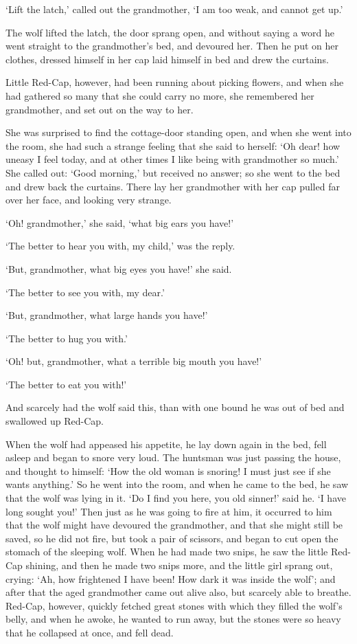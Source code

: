 \documentclass[oneside,11pt]{memoir} %
\begin{document}
`Lift the latch,' called out the grandmother, `I am too weak, and cannot get up.'

The wolf lifted the latch, the door sprang open, and without saying a word he went straight to the grandmother's bed, and devoured her. Then he put on her clothes, dressed himself in her cap laid himself in bed and drew the curtains.

Little Red-Cap, however, had been running about picking flowers, and when she had gathered so many that she could carry no more, she remembered her grandmother, and set out on the way to her.

She was surprised to find the cottage-door standing open, and when she went into the room, she had such a strange feeling that she said to herself: `Oh dear! how uneasy I feel today, and at other times I like being with grandmother so much.' She called out: `Good morning,' but received no answer; so she went to the bed and drew back the curtains. There lay her grandmother with her cap pulled far over her face, and looking very strange.

`Oh! grandmother,' she said, `what big ears you have!'

`The better to hear you with, my child,' was the reply.

`But, grandmother, what big eyes you have!' she said.

`The better to see you with, my dear.'

`But, grandmother, what large hands you have!'

`The better to hug you with.'

`Oh! but, grandmother, what a terrible big mouth you have!'

`The better to eat you with!'

And scarcely had the wolf said this, than with one bound he was out of bed and swallowed up Red-Cap.

When the wolf had appeased his appetite, he lay down again in the bed, fell asleep and began to snore very loud. The huntsman was just passing the house, and thought to himself: `How the old woman is snoring! I must just see if she wants anything.' So he went into the room, and when he
came to the bed, he saw that the wolf was lying in it. `Do I find you here, you old sinner!' said he. `I have long sought you!' Then just as he was going to fire at him, it occurred to him that the wolf might have devoured the grandmother, and that she might still be saved, so he did not fire, but took a pair of scissors, and began to cut open the stomach of the sleeping wolf. When he had made two snips, he saw the little Red-Cap shining, and then he made two snips more, and the little girl sprang out, crying: `Ah, how frightened I have been! How dark it was inside the wolf'; and after that the aged grandmother came out alive also, but scarcely able to breathe. Red-Cap, however, quickly fetched
great stones with which they filled the wolf's belly, and when he awoke, he wanted to run away, but the stones were so heavy that he collapsed at once, and fell dead.
\end{document}
